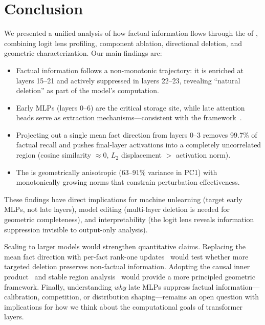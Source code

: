 \section{Conclusion}
\label{sec:conclusion}

We presented a unified analysis of how factual information flows through the \residstream of \gptmed, combining logit lens profiling, component ablation, directional deletion, and geometric characterization. Our main findings are:

\begin{itemize}[leftmargin=*,itemsep=0pt,topsep=0pt]
    \item Factual information follows a non-monotonic trajectory: it is enriched at layers 15--21 and actively suppressed in layers 22--23, revealing ``natural deletion'' as part of the model's computation.
    \item Early MLPs (layers 0--6) are the critical storage site, while late attention heads serve as extraction mechanisms---consistent with the \flu framework~\citep{ghosh2024mechanistic}.
    \item Projecting out a single mean fact direction from layers 0--3 removes 99.7\% of factual recall and pushes final-layer activations into a completely uncorrelated region (cosine similarity $\approx 0$, $L_2$ displacement $>$ activation norm).
    \item The \residstream is geometrically anisotropic (63--91\% variance in PC1) with monotonically growing norms that constrain perturbation effectiveness.
\end{itemize}

These findings have direct implications for machine unlearning (target early MLPs, not late layers), model editing (multi-layer deletion is needed for geometric completeness), and interpretability (the logit lens reveals information suppression invisible to output-only analysis).

 Scaling to larger models would strengthen quantitative claims. Replacing the mean fact direction with per-fact rank-one updates~\citep{meng2022locating} would test whether more targeted deletion preserves non-factual information. Adopting the causal inner product~\citep{park2023linear} and stable region analysis~\citep{janiak2024stable} would provide a more principled geometric framework. Finally, understanding \emph{why} late MLPs suppress factual information---calibration, competition, or distribution shaping---remains an open question with implications for how we think about the computational goals of transformer layers.
